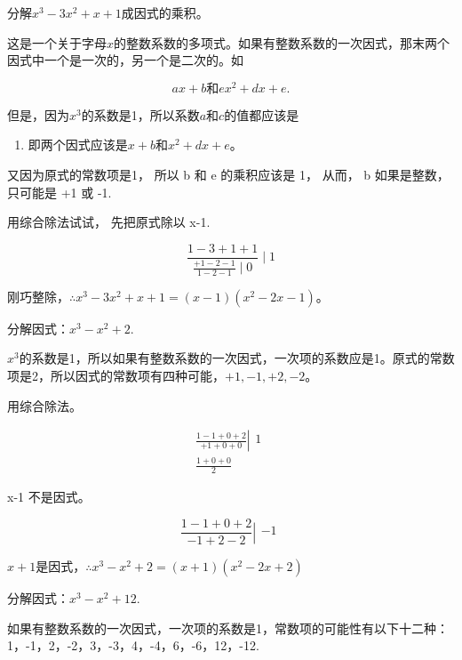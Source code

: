  分解\(x^{3} - 3x^{2} + x + 1\)成因式的乘积。

这是一个关于字母\(x\)的整数系数的多项式。如果有整数系数的一次因式，那末两个因式中一个是一次的，另一个是二次的。如

\[
a x + b \text{和} e x ^{2} + d x + e.
\]

但是，因为\(x^{3}\)的系数是1，所以系数\(a\)和\(c\)的值都应该是

\begin{enumerate}
\item
  即两个因式应该是\(x + b\)和\(x^{2} + dx + e\)。
\end{enumerate}

又因为原式的常数项是1， 所以 b 和 e 的乘积应该是 1， 从而， b
如果是整数， 只可能是 +1 或 -1.

用综合除法试试， 先把原式除以 x-1.


\[
\frac{1 - 3 + 1 + 1}{\frac{+ 1 - 2 - 1}{1 - 2 - 1} \mid 0} \mid 1
\]

刚巧整除，\(\therefore x^{3}-3x^{2}+x+1=(x-1)(x^{2}-2x-1)\)。

 分解因式：\(x^{3} - x^{2} + 2.\)

\(x^{3}\)的系数是1，所以如果有整数系数的一次因式，一次项的系数应是1。原式的常数项是2，所以因式的常数项有四种可能，\(+1, -1, +2, -2\)。

 用综合除法。

\[
\begin{array}{l} \frac{1 - 1 + 0 + 2}{+ 1 + 0 + 0} \left| \begin{array}{l} 1 \\ \hline {} \end{array} \right. \\ \frac{1 + 0 + 0}{2} \end{array}
\]

x-1 不是因式。

\[
\frac{1 - 1 + 0 + 2}{- 1 + 2 - 2} \left| \begin{array}{l} - 1 \\ \hline {} \end{array} \right.
\]

\(x + 1\)是因式，\(\therefore x^{3} - x^{2} + 2 = (x + 1)(x^{2} - 2x + 2)\)

 分解因式：\(x^{3} - x^{2} + 12.\)

如果有整数系数的一次因式，一次项的系数是1，常数项的可能性有以下十二种：1，-1，2，-2，3，-3，4，-4，6，-6，12，-12.


